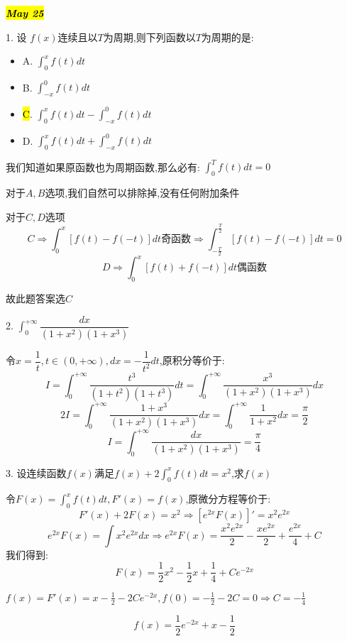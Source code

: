 
\hl{\textbf{\textit{May 25}}}

1. 设 $f(x)$连续且以$T$为周期,则下列函数以$T$为周期的是: 
\begin{itemize}
	\item A. $\int_{0}^{x}f(t)dt$ 
	\item B. $\int_{-x}^{0}f(t)dt$ 
	\item \hl{C}. $\int_{0}^{x}f(t)dt-\int_{-x}^{0}f(t)dt$ 
	\item D. $\int_{0}^{x}f(t)dt+\int_{-x}^{0}f(t)dt$ 
\end{itemize}
\begin{solution}
	
	我们知道如果原函数也为周期函数,那么必有: $\int_{0}^{T}f(t)dt=0$
	
	对于$A,B$选项,我们自然可以排除掉,没有任何附加条件
	
	对于$C,D$选项
	$$C\Rightarrow \int_{0}^{x}[f(t)-f(-t)]dt\text{奇函数}\Rightarrow \int_{-\frac{T}{2}}^{\frac{T}{2}}[f(t)-f(-t)]dt=0$$
	$$D\Rightarrow \int_{0}^{x}[f(t)+f(-t)]dt\text{偶函数}$$
	
	故此题答案选$C$
\end{solution}


2. $\int_{0}^{+\infty}\dfrac{dx}{(1+x^2)(1+x^3)}$
\begin{solution}
	
	令$x=\dfrac{1}{t},t\in(0,+\infty),dx=-\dfrac{1}{t^2}dt$,原积分等价于: 
	$$I=\int_{0}^{+\infty}\dfrac{t^3}{(1+t^2)(1+t^3)}dt=\int_{0}^{+\infty}\dfrac{x^3}{(1+x^2)(1+x^3)}dx$$
	$$2I=\int_{0}^{+\infty}\dfrac{1+x^3}{(1+x^2)(1+x^3)}dx=\int_{0}^{+\infty}\dfrac{1}{1+x^2}dx=\frac{\pi}{2}$$
	$$I=\int_{0}^{+\infty}\dfrac{dx}{(1+x^2)(1+x^3)}=\frac{\pi}{4}$$
\end{solution}


3. 设连续函数$f(x)$满足$f(x)+2\int_{0}^{x}f(t)dt=x^2$,求$f(x)$
\begin{solution}
	
	令$F(x)=\int_{0}^{x}f(t)dt,F'(x)=f(x)$,原微分方程等价于: 
	$$F'(x)+2F(x)=x^2\Rightarrow [e^{2x}F(x)]'=x^2e^{2x}$$
	$$e^{2x}F(x)=\int x^2e^{2x}dx\Rightarrow e^{2x}F(x)=\frac{x^2e^{2x}}{2}-\frac{xe^{2x}}{2}+\frac{e^{2x}}{4}+C$$
	我们得到: $$F(x)=\frac{1}{2}x^2-\frac{1}{2}x+\frac{1}{4}+Ce^{-2x}$$
	
	$f(x)=F'(x)=x-\frac{1}{2}-2Ce^{-2x},f(0)=-\frac{1}{2}-2C=0\Rightarrow C=-\frac{1}{4}$
	
	$$f(x)=\frac{1}{2}e^{-2x}+x-\frac{1}{2}$$
	
\end{solution}

